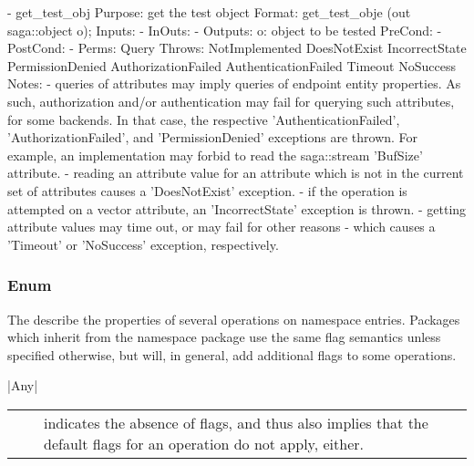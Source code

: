 \begin{myspec}
 
    - get_test_obj
      Purpose:  get the test object
      Format:   get_test_obje        (out saga::object o);
      Inputs:   -
      InOuts:   -
      Outputs:  o:                    object to be tested
      PreCond:  -
      PostCond: -
      Perms:    Query
      Throws:   NotImplemented
                DoesNotExist
                IncorrectState
                PermissionDenied
                AuthorizationFailed
                AuthenticationFailed
                Timeout
                NoSuccess
      Notes:    - queries of attributes may imply queries of
                  endpoint entity properties.  As such,
                  authorization and/or authentication may fail
                  for querying such attributes, for some
                  backends.  In that case, the respective
                  'AuthenticationFailed', 'AuthorizationFailed',
                  and 'PermissionDenied' exceptions are thrown.
                  For example, an implementation may forbid to
                  read the saga::stream 'BufSize' attribute.
                - reading an attribute value for an attribute
                  which is not in the current set of attributes
                  causes a 'DoesNotExist' exception.
                - if the operation is attempted on a vector
                  attribute, an 'IncorrectState' exception is
                  thrown.
                - getting attribute values may time out, or may 
                  fail for other reasons - which causes a 
                  'Timeout' or 'NoSuccess' exception, 
                  respectively.
 \end{myspec}
 
 
  \subsubsection*{Enum }
 
  The  describe the properties of several
  operations on namespace entries.  Packages which inherit from
  the namespace package use the same flag semantics unless
  specified otherwise, but will, in general, add additional flags
  to some operations.
  
    |Any|\\[0.3mm]
    \begin{tabular}{cp{110mm}}
      ~~ & indicates the absence of flags, and thus also
           implies that the default flags for an operation do 
           not apply, either.
    \end{tabular}
 
